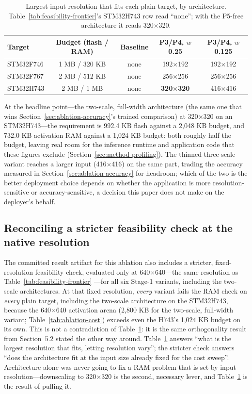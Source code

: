 \documentclass[11pt]{article}
\begin{document}
\begin{table}[h]
\centering
\begin{tabular}{lcccc}
\toprule
Target & Budget (flash / RAM) & Baseline & P3/P4, $w$0.25 & P3/P4, $w$0.125 \\
\midrule
STM32F746 & 1 MB / 320 KB & none & 192$\times$192 & 192$\times$192 \\
STM32F767 & 2 MB / 512 KB & none & 256$\times$256 & 256$\times$256 \\
STM32H743 & 2 MB / 1 MB   & none & \textbf{320$\times$320} & 416$\times$416 \\
\bottomrule
\end{tabular}
\caption{Largest input resolution that fits each plain target, by
architecture. Table~\ref{tab:feasibility-frontier}'s STM32H743 row read
``none''; with the P5-free architecture it reads 320$\times$320.}
\label{tab:deployment-envelope}
\end{table}

At the headline point---the two-scale, full-width architecture (the same one
that wins Section~\ref{sec:ablation-accuracy}'s trained comparison) at
320$\times$320 on an STM32H743---the requirement is 992.4 KB flash against a
2,048 KB budget, and 732.0 KB activation RAM against a 1,024 KB budget: both
roughly half the budget, leaving real room for the inference runtime and
application code that these figures exclude
(Section~\ref{sec:method-profiling}). The thinned three-scale variant
reaches a larger input (416$\times$416) on the same part, trading the
accuracy measured in Section~\ref{sec:ablation-accuracy} for headroom; which
of the two is the better deployment choice depends on whether the
application is more resolution-sensitive or accuracy-sensitive, a decision
this paper does not make on the deployer's behalf.

\subsection{Reconciling a stricter feasibility check at the native resolution}

The committed result artifact for this ablation also includes a stricter,
fixed-resolution feasibility check, evaluated only at
640$\times$640---the same resolution as Table~\ref{tab:feasibility-frontier}
---for all six Stage-1 variants, including the two-scale architectures. At
that fixed resolution, \emph{every} variant fails the RAM check on
\emph{every} plain target, including the two-scale architecture on the
STM32H743, because the 640$\times$640 activation arena (2,800 KB for the
two-scale, full-width variant; Table~\ref{tab:ablation-cost}) exceeds even
the H743's 1,024 KB budget on its own. This is not a contradiction of
Table~\ref{tab:deployment-envelope}: it is the same orthogonality result from
Section~5.2 stated the other way around. Table~\ref{tab:deployment-envelope}
answers ``what is the largest resolution that fits, letting resolution
vary''; the stricter check answers ``does the architecture fit at the input
size already fixed for the cost sweep''. Architecture alone was never going
to fix a RAM problem that is set by input resolution---downscaling to
320$\times$320 is the second, necessary lever, and Table~\ref{tab:deployment-envelope}
is the result of pulling it.
\end{document}
